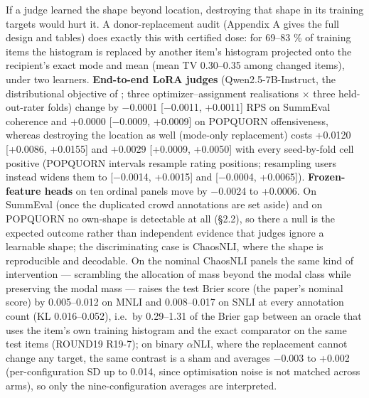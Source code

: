 \documentclass[10pt]{article}
\begin{document}
If a judge learned the shape beyond location, destroying that shape in its training targets would hurt it. A donor-replacement audit (Appendix A gives the full design and tables) does exactly this with certified dose: for 69--83 \% of training items the histogram is replaced by another item's histogram projected onto the recipient's exact mode and mean (mean TV 0.30--0.35 among changed items), under two learners. \textbf{End-to-end LoRA judges} (Qwen2.5-7B-Instruct, the distributional objective of \citealp{chen2025beyond}; three optimizer--assignment realisations $\times$ three held-out-rater folds) change by $-$0.0001 {[}$-$0.0011, +0.0011{]} RPS on SummEval coherence and +0.0000 {[}$-$0.0009, +0.0009{]} on POPQUORN offensiveness, whereas destroying the location as well (mode-only replacement) costs +0.0120 {[}+0.0086, +0.0155{]} and +0.0029 {[}+0.0009, +0.0050{]} with every seed-by-fold cell positive (POPQUORN intervals resample rating positions; resampling users instead widens them to {[}$-$0.0014, +0.0015{]} and {[}$-$0.0004, +0.0065{]}). \textbf{Frozen-feature heads} on ten ordinal panels move by $-$0.0024 to +0.0006. On SummEval (once the duplicated crowd annotations are set aside) and on POPQUORN no own-shape is detectable at all (\S{}2.2), so there a null is the expected outcome rather than independent evidence that judges ignore a learnable shape; the discriminating case is ChaosNLI, where the shape is reproducible and decodable. On the nominal ChaosNLI panels the same kind of intervention --- scrambling the allocation of mass beyond the modal class while preserving the modal mass --- raises the test Brier score (the paper's nominal score) by 0.005--0.012 on MNLI and 0.008--0.017 on SNLI at every annotation count (KL 0.016--0.052), i.e.~by 0.29--1.31 of the Brier gap between an oracle that uses the item's own training histogram and the exact comparator on the same test items (ROUND19 R19-7); on binary $\alpha$NLI, where the replacement cannot change any target, the same contrast is a sham and averages $-$0.003 to +0.002 (per-configuration SD up to 0.014, since optimisation noise is not matched across arms), so only the nine-configuration averages are interpreted.
\end{document}
